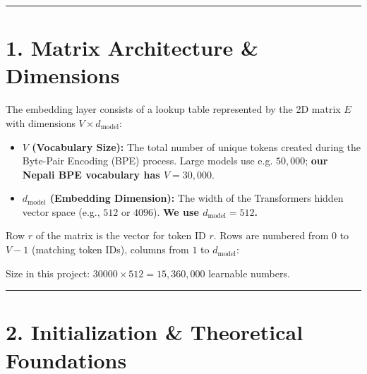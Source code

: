 \documentclass[11pt,a4paper,oneside]{report}
\providecommand{\tightlist}{\setlength{\itemsep}{0pt}\setlength{\parskip}{0pt}}
\begin{document}
\begin{center}\rule{0.5\linewidth}{0.5pt}\end{center}

\section{1. Matrix Architecture \& Dimensions}\label{1-matrix-architecture--dimensions}

The embedding layer consists of a lookup table represented by the 2D matrix \(E\) with dimensions \(V \times d_{\text{model}}\):

\begin{itemize}
\tightlist
\item
  \textbf{\(V\) (Vocabulary Size):} The total number of unique tokens created during the Byte-Pair Encoding (BPE) process. Large models use e.g. \(50,000\); \textbf{our Nepali BPE vocabulary has \(V = 30,000\)}.
\item
  \textbf{\(d_{\text{model}}\) (Embedding Dimension):} The width of the Transformer\textquotesingle s hidden vector space (e.g., \(512\) or \(4096\)). \textbf{We use \(d_{\text{model}} = 512\).}
\end{itemize}

Row \(r\) of the matrix is the vector for token ID \(r\). Rows are numbered from \(0\) to \(V-1\) (matching token IDs), columns from \(1\) to \(d_{\text{model}}\):

\begin{center}\end{center}

Size in this project: \(30000 \times 512 = 15,360,000\) learnable numbers.

\begin{center}\rule{0.5\linewidth}{0.5pt}\end{center}

\section{2. Initialization \& Theoretical Foundations}\label{2-initialization--theoretical-foundations}
\end{document}
